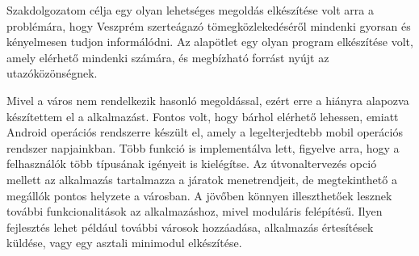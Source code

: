 
Szakdolgozatom célja egy olyan lehetséges megoldás elkészítése volt arra a problémára, hogy Veszprém szerteágazó tömegközlekedéséről mindenki gyorsan és kényelmesen tudjon informálódni.
Az alapötlet egy olyan program elkészítése volt, amely elérhető mindenki számára, és megbízható forrást nyújt az utazóközönségnek.

Mivel a város nem rendelkezik hasonló megoldással, ezért erre a hiányra alapozva készítettem el a  alkalmazást.
Fontos volt, hogy bárhol elérhető lehessen, emiatt Android operációs rendszerre készült el, amely a legelterjedtebb mobil operációs rendszer napjainkban. 
Több funkció is implementálva lett, figyelve arra, hogy a felhasználók több típusának igényeit is kielégítse.
Az útvonaltervezés opció mellett az alkalmazás tartalmazza a járatok menetrendjeit, de megtekinthető a megállók pontos helyzete a városban.
A jövőben könnyen illeszthetőek lesznek további funkcionalitások az alkalmazáshoz, mivel  moduláris felépítésű.
Ilyen fejlesztés lehet például további városok hozzáadása, alkalmazás értesítések küldése, vagy egy asztali minimodul elkészítése.